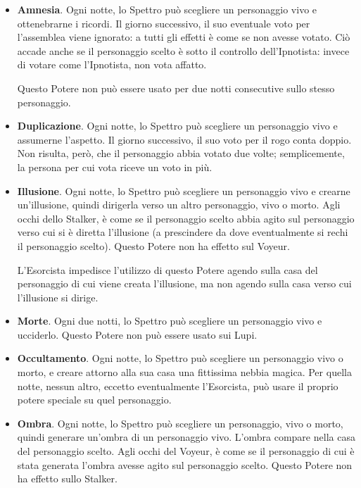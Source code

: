 \documentclass[a4paper,10pt]{article}
\begin{document}
\begin{itemize}
 \item {\bf Amnesia}. Ogni notte, lo Spettro può scegliere un personaggio vivo e ottenebrarne i ricordi. Il giorno successivo, il suo eventuale voto per l'assemblea viene ignorato: a tutti gli effetti è come se non avesse votato. Ciò accade anche se il personaggio scelto è sotto il controllo dell'Ipnotista: invece di votare come l'Ipnotista, non vota affatto.
 
 Questo Potere non può essere usato per due notti consecutive sullo stesso personaggio.

 \item {\bf Duplicazione}. Ogni notte, lo Spettro può scegliere un personaggio vivo e assumerne l'aspetto. Il giorno successivo, il suo voto per il rogo conta doppio. Non risulta, però, che il personaggio abbia votato due volte; semplicemente, la persona per cui vota riceve un voto in più.

 \item {\bf Illusione}. Ogni notte, lo Spettro può scegliere un personaggio vivo e crearne un'illusione, quindi dirigerla verso un altro personaggio, vivo o morto.
 Agli occhi dello Stalker, è come se il personaggio scelto abbia agito sul personaggio verso cui si è diretta l'illusione (a prescindere da dove eventualmente si rechi il personaggio scelto).
 Questo Potere non ha effetto sul Voyeur.
 
 L'Esorcista impedisce l'utilizzo di questo Potere agendo sulla casa del personaggio di cui viene creata l'illusione, ma non agendo sulla casa verso cui l'illusione si dirige. 
 
 \item {\bf Morte}. Ogni due notti, lo Spettro può scegliere un personaggio vivo e ucciderlo. Questo Potere non può essere usato sui Lupi.
 
 \item {\bf Occultamento}. Ogni notte, lo Spettro può scegliere un personaggio vivo o morto, e creare attorno alla sua casa una fittissima nebbia magica. Per quella notte, nessun altro, eccetto eventualmente l'Esorcista, può usare il proprio potere speciale su quel personaggio.
 
 \item {\bf Ombra}. Ogni notte, lo Spettro può scegliere un personaggio, vivo o morto, quindi generare un'ombra di un personaggio vivo. L'ombra compare nella casa del personaggio scelto.
 Agli occhi del Voyeur, è come se il personaggio di cui è stata generata l'ombra avesse agito sul personaggio scelto.
 Questo Potere non ha effetto sullo Stalker.
 

\end{itemize}
\end{document}
